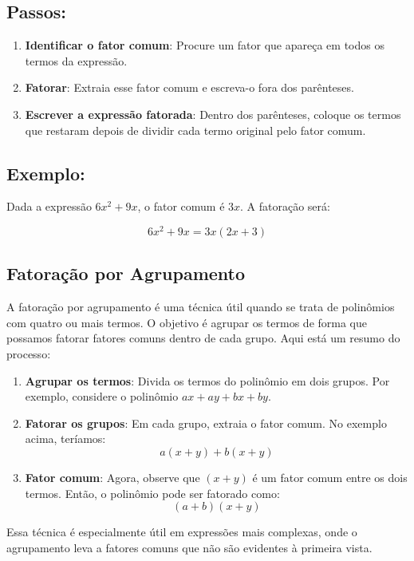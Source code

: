\documentclass{article}
\begin{document}
\subsection*{Passos:}
\begin{enumerate}
    \item \textbf{Identificar o fator comum}: Procure um fator que apareça em todos os termos da expressão.
    \item \textbf{Fatorar}: Extraia esse fator comum e escreva-o fora dos parênteses.
    \item \textbf{Escrever a expressão fatorada}: Dentro dos parênteses, coloque os termos que restaram depois de dividir cada termo original pelo fator comum.
\end{enumerate}

\subsection*{Exemplo:}
Dada a expressão \( 6x^2 + 9x \), o fator comum é \( 3x \). A fatoração será:

\[
6x^2 + 9x = 3x(2x + 3)
\]

\subsection{Fatoração por Agrupamento}
A fatoração por agrupamento é uma técnica útil quando se trata de polinômios com quatro ou mais termos. O objetivo é agrupar os termos de forma que possamos fatorar fatores comuns dentro de cada grupo. Aqui está um resumo do processo:

\begin{enumerate}
    \item \textbf{Agrupar os termos}: Divida os termos do polinômio em dois grupos. Por exemplo, considere o polinômio \( ax + ay + bx + by \).
    
    \item \textbf{Fatorar os grupos}: Em cada grupo, extraia o fator comum. No exemplo acima, teríamos:
    \[
    a(x + y) + b(x + y)
    \]
    
    \item \textbf{Fator comum}: Agora, observe que \( (x + y) \) é um fator comum entre os dois termos. Então, o polinômio pode ser fatorado como:
    \[
    (a + b)(x + y)
    \]
\end{enumerate}

Essa técnica é especialmente útil em expressões mais complexas, onde o agrupamento leva a fatores comuns que não são evidentes à primeira vista.
\end{document}
